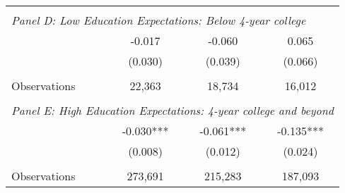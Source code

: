 {\begin{tabular}{lccc}
&  &  &   \\
\multicolumn{4}{l}{\textit{Panel D: Low Education Expectations: Below 4-year college}} \\
\hspace{3mm}        &      -0.017   &      -0.060   &       0.065   \\
                    &     (0.030)   &     (0.039)   &     (0.066)   \\
                    &               &               &               \\
\hspace{3mm}Observations&      22,363   &      18,734   &      16,012   \\
 
&  &  &   \\
\multicolumn{4}{l}{\textit{Panel E: High Education Expectations: 4-year college and beyond}} \\
\hspace{3mm}        &      -0.030***&      -0.061***&      -0.135***\\
                    &     (0.008)   &     (0.012)   &     (0.024)   \\
                    &               &               &               \\
\hspace{3mm}Observations&     273,691   &     215,283   &     187,093   \\
 

\bottomrule
\end{tabular}
}
